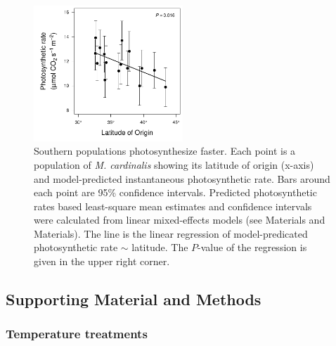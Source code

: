 \documentclass[11pt, oneside]{article}
\begin{document}
\begin{figure}[h!]
	\centerline{\includegraphics[width=0.5\textwidth]{Figures/FigureS_Photolat.pdf}}
	\fontsize{10}{12}
	\selectfont
	\caption[Southern populations photosynthesize faster.]{Southern populations photosynthesize faster. Each point is a population of \textit{M. cardinalis} showing its latitude of origin (x-axis) and model-predicted instantaneous photosynthetic rate. Bars around each point are 95\% confidence intervals. Predicted photosynthetic rates based least-square mean estimates and confidence intervals were calculated from linear mixed-effects models (see Materials and Materials). The line is the linear regression of model-predicated photosynthetic rate $\sim$ latitude. The $P$-value of the regression is given in the upper right corner.}
	\label{fig:FigS_Photolat}
\end{figure}




\clearpage

\subsection*{Supporting Material and Methods}

\subsubsection*{Temperature treatments}
\end{document}
